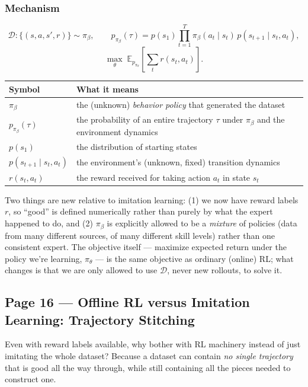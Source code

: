 \subsubsection*{Mechanism}

\[
\mathcal{D} : \{(s,a,s',r)\} \sim \pi_\beta, \qquad
p_{\pi_\beta}(\tau) = p(s_1)\prod_{t=1}^{T} \pi_\beta(a_t\mid s_t)\, p(s_{t+1}\mid s_t,a_t),
\]
\[
\max_\theta\; \mathbb{E}_{p_{\pi_\theta}}\left[\sum_t r(s_t,a_t)\right].
\]

\begin{center}
\begin{tabular}{@{}ll@{}}
\toprule
Symbol & What it means \\
\midrule
$\pi_\beta$ & the (unknown) \emph{behavior policy} that generated the dataset \\
$p_{\pi_\beta}(\tau)$ & the probability of an entire trajectory $\tau$ under $\pi_\beta$ and the environment dynamics \\
$p(s_1)$ & the distribution of starting states \\
$p(s_{t+1}\mid s_t,a_t)$ & the environment's (unknown, fixed) transition dynamics \\
$r(s_t,a_t)$ & the reward received for taking action $a_t$ in state $s_t$ \\
\bottomrule
\end{tabular}
\end{center}

Two things are new relative to imitation learning: (1) we now have reward labels $r$, so ``good'' is defined numerically rather than purely by what the expert happened to do, and (2) $\pi_\beta$ is explicitly allowed to be a \emph{mixture} of policies (data from many different sources, of many different skill levels) rather than one consistent expert. The objective itself --- maximize expected return under the policy we're learning, $\pi_\theta$ --- is the same objective as ordinary (online) RL; what changes is that we are only allowed to use $\mathcal{D}$, never new rollouts, to solve it.

\subsection*{Page 16 --- Offline RL versus Imitation Learning: Trajectory Stitching}

Even with reward labels available, why bother with RL machinery instead of just imitating the whole dataset? Because a dataset can contain \emph{no single trajectory} that is good all the way through, while still containing all the pieces needed to construct one.


